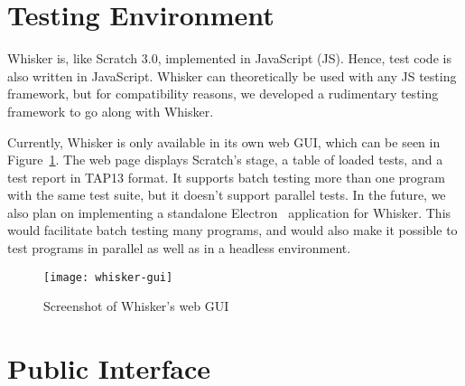 \section{Testing Environment}
\label{sec:testing_environment}

Whisker is, like Scratch 3.0, implemented in JavaScript (JS).
Hence, test code is also written in JavaScript.
Whisker can theoretically be used with any JS testing framework,
but for compatibility reasons, we developed a rudimentary testing framework to go along with Whisker.
\parspace

Currently, Whisker is only available in its own web GUI, which can be seen in Figure~\ref{fig:whisker_gui}.
The web page displays Scratch's stage, a table of loaded tests, and a test report in TAP13 format.
It supports batch testing more than one program with the same test suite,
but it doesn't support parallel tests.
In the future, we also plan on implementing a standalone Electron~\cite{electron} application for Whisker.
This would facilitate batch testing many programs,
and would also make it possible to test programs in parallel as well as in a headless environment.

\begin{figure}[htpb]
    \centering
    \texttt{[image: whisker-gui]}
    \caption{Screenshot of Whisker's web GUI}
    \label{fig:whisker_gui}
\end{figure}






\section{Public Interface}
\label{sec:public_interface}

